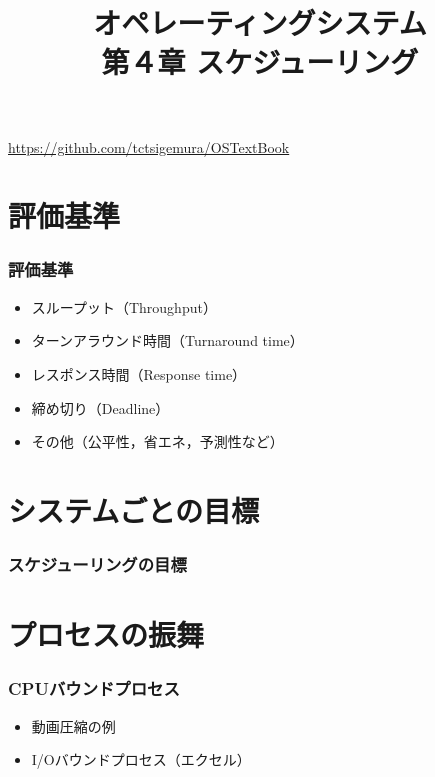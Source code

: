 \documentclass[unicode]{beamer}                   %
\begin{document}
\title[スケジューリング]
      {オペレーティングシステム\\第４章 スケジューリング}
\date{}
\begin{frame}
  \titlepage
  \centerline{\url{https://github.com/tctsigemura/OSTextBook}}
\end{frame}


\section{評価基準}
\begin{frame}
  \frametitle{評価基準}
  \begin{itemize}
    \item スループット（Throughput）
    \item ターンアラウンド時間（Turnaround time）
    \item レスポンス時間（Response time）
    \item 締め切り（Deadline）
    \item その他（公平性，省エネ，予測性など）
  \end{itemize}
\end{frame}

\section{システムごとの目標}
\begin{frame}
  \frametitle{スケジューリングの目標}
\end{frame}

\section{プロセスの振舞}
\begin{frame}
  \frametitle{CPUバウンドプロセス}
  \begin{itemize}
    \item 動画圧縮の例
    \item I/Oバウンドプロセス（エクセル）
  \end{itemize}
\end{frame}
\end{document}
